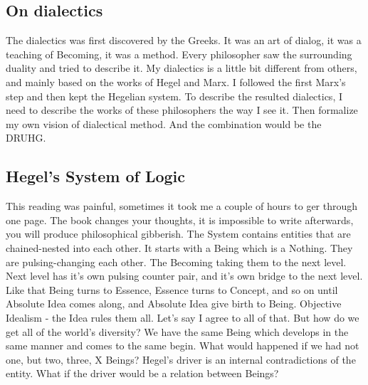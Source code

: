 \documentclass[12pt, a4paper, twocolumn]{article}
\begin{document}
\begin{appendices}
\section{On dialectics}\label{On dialectics}
The dialectics was first discovered by the Greeks. It was an art of dialog, it was a teaching of Becoming, it was a method. Every philosopher saw the surrounding duality and tried to describe it. My dialectics is a little bit different from others, and mainly based on the works of Hegel and Marx. I followed the first Marx's step and then kept the Hegelian system. To describe the resulted dialectics, I need to describe the works of these philosophers the way I see it. Then formalize my own vision of dialectical method. And the combination would be the DRUHG.

\subsection{Hegel's System of Logic}
This reading was painful, sometimes it took me a couple of hours to ger through one page. The book changes your thoughts, it is impossible to write afterwards, you will produce philosophical gibberish.
The System contains entities that are chained-nested into each other. 
It starts with a Being which is a Nothing. They are pulsing-changing each other. The Becoming taking them to the next level. Next level has it's own pulsing counter pair, and it's own bridge to the next level.
Like that Being turns to Essence, Essence turns to Concept, and so on until Absolute Idea comes along, and Absolute Idea give birth to Being.
Objective Idealism - the Idea rules them all.
Let's say I agree to all of that. But how do we get all of the world's diversity? We have the same Being which develops in the same manner and comes to the same begin.
What would happened if we had not one, but two, three, X Beings?
Hegel's driver is an internal contradictions of the entity.
What if the driver would be a relation between Beings?


\end{appendices}
\end{document}
